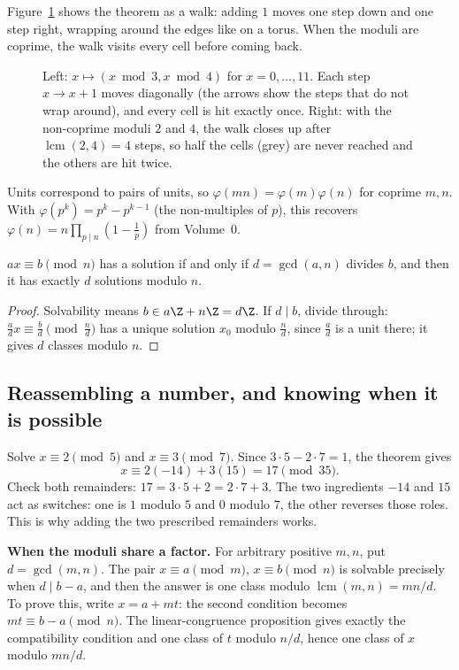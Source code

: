 Figure~\ref{fig:crt} shows the theorem as a walk: adding $1$ moves one step down and one step right, wrapping around the edges like on a torus. When the moduli are coprime, the walk visits every cell before coming back.

\begin{figure}[ht]
\centering
{}
\caption{Left: $x\mapsto(x\bmod3,x\bmod4)$ for $x=0,\dots,11$. Each step $x\to x+1$ moves diagonally (the arrows show the steps that do not wrap around), and every cell is hit exactly once. Right: with the non-coprime moduli $2$ and $4$, the walk closes up after $\operatorname{lcm}(2,4)=4$ steps, so half the cells (grey) are never reached and the others are hit twice.}
\label{fig:crt}
\end{figure}

Units correspond to pairs of units, so $\varphi(mn)=\varphi(m)\varphi(n)$ for coprime $m,n$. With $\varphi(p^k)=p^k-p^{k-1}$ (the non-multiples of $p$), this recovers $\varphi(n)=n\prod_{p\mid n}\left(1-\frac1p\right)$ from Volume~0.

\begin{proposition}\label{prop:lincong}
$ax\equiv b\pmod n$ has a solution if and only if $d=\gcd(a,n)$ divides $b$, and then it has exactly $d$ solutions modulo $n$.
\end{proposition}
\begin{proof}
Solvability means $b\in a\Z+n\Z=d\Z$. If $d\mid b$, divide through: $\frac adx\equiv\frac bd\pmod{\frac nd}$ has a unique solution $x_0$ modulo $\frac nd$, since $\frac ad$ is a unit there; it gives $d$ classes modulo $n$.
\end{proof}

\subsection*{Reassembling a number, and knowing when it is possible}
Solve $x\equiv2\pmod5$ and $x\equiv3\pmod7$. Since $3\cdot5-2\cdot7=1$, the theorem gives
\[
x\equiv2(-14)+3(15)=17\pmod{35}.
\]
Check both remainders: $17=3\cdot5+2=2\cdot7+3$. The two ingredients $-14$ and $15$ act as switches: one is $1$ modulo $5$ and $0$ modulo $7$, the other reverses those roles. This is why adding the two prescribed remainders works.

\textbf{When the moduli share a factor.} For arbitrary positive $m,n$, put $d=\gcd(m,n)$. The pair $x\equiv a\pmod m$, $x\equiv b\pmod n$ is solvable precisely when $d\mid b-a$, and then the answer is one class modulo $\operatorname{lcm}(m,n)=mn/d$. To prove this, write $x=a+mt$: the second condition becomes $mt\equiv b-a\pmod n$. The linear-congruence proposition gives exactly the compatibility condition and one class of $t$ modulo $n/d$, hence one class of $x$ modulo $mn/d$.

